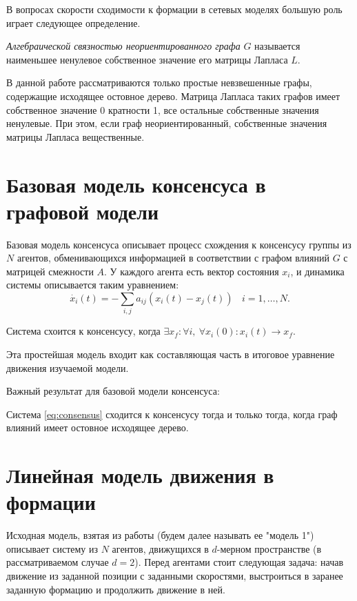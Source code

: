 В вопросах скорости сходимости к формации в сетевых моделях большую роль играет следующее определение.

\begin{definition}
\emph{Алгебраической связностью неориентированного графа} $G$ называется наименьшее ненулевое собственное значение его матрицы Лапласа $L$.
\end{definition}

В данной работе рассматриваются только простые невзвешенные графы, содержащие исходящее остовное дерево. Матрица Лапласа таких графов имеет собственное значение 0 кратности 1, все остальные собственные значения ненулевые. При этом, если граф неориентированный, собственные значения матрицы Лапласа вещественные.

\section{Базовая модель консенсуса в графовой модели}

Базовая модель консенсуса описывает процесс схождения к консенсусу группы из $N$ агентов, обменивающихся информацией в соответствии с графом влияний $G$ с матрицей смежности $A$. У каждого агента есть вектор состояния $x_i$, и динамика системы описывается таким уравнением:
\begin{equation}
\label{eq:consensus}
\dot{x_i}(t)=-\sum_{i,j}a_{ij}\left(x_i(t)-x_j(t)\right)\ \ \ \ i=1,\ldots,N.
\end{equation}

Система схоится к консенсусу, когда $\exists x_f: \forall i,\ \forall x_i(0): x_i(t)\rightarrow x_f.$

Эта простейшая модель входит как составляющая часть в итоговое уравнение движения изучаемой модели.

Важный результат для базовой модели консенсуса:
\begin{theorem}
Система \ref{eq:consensus} сходится к консенсусу тогда и только тогда, когда граф влияний имеет остовное исходящее дерево. 
\end{theorem}

\section{Линейная модель движения в формации}
Исходная модель, взятая из работы \cite{veerman2005flocks} (будем далее называть ее "модель 1") описывает систему из $N$ агентов, движущихся в $d$-мерном пространстве (в рассматриваемом случае $d=2$). Перед агентами стоит следующая задача: начав движение из заданной позиции с заданными скоростями, выстроиться в заранее заданную формацию и продолжить движение в ней. 

